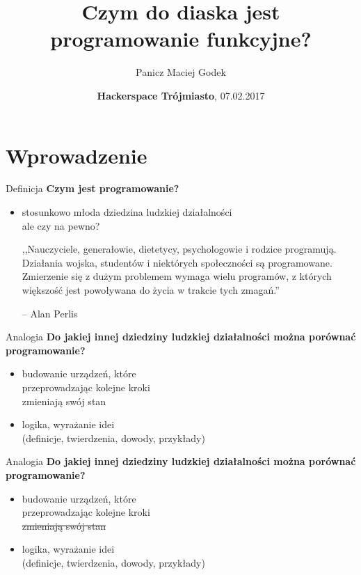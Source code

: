 \documentclass{beamer}
\title{\textbf{Czym do diaska jest programowanie funkcyjne?}}
\author{Panicz Maciej Godek}
\institute{
  \tiny{\href{mailto:godek.maciek@gmail.com}{\textbf{godek.maciek@gmail.com}}}
}
\date{\textbf{Hackerspace Trójmiasto}, 07.02.2017}
\begin{document}
\begin{frame}
  \titlepage
\end{frame}

\section{Wprowadzenie}

\begin{frame}{Definicja}
  \textbf{Czym jest programowanie?}
  \pause
  \begin{itemize}
  \item stosunkowo młoda dziedzina ludzkiej działalności
    \pause
    \\ ale czy na pewno?
    \pause
    \begin{displayquote}
      ,,Nauczyciele, generałowie, dietetycy, psychologowie i rodzice programują.
      Działania wojska, studentów i niektórych społeczności są programowane.
      Zmierzenie się z dużym problemem wymaga wielu programów, z których
      większość jest powoływana do życia w trakcie tych zmagań.''
    \end{displayquote}
    -- Alan Perlis
    
  \end{itemize}

\end{frame}

\begin{frame}{Analogia}
  \textbf{Do jakiej innej dziedziny ludzkiej działalności
    można porównać programowanie?}
  \pause
  \begin{itemize}
  \item budowanie urządzeń\pause, które \\
    przeprowadzając kolejne kroki \\
    \pause zmieniają swój stan
    \pause
  \item logika, wyrażanie idei \\
    \pause (definicje, twierdzenia, dowody, przykłady)
  \end{itemize}
\end{frame}


\begin{frame}{Analogia}
  \textbf{Do jakiej innej dziedziny ludzkiej działalności
    można porównać programowanie?}
  \begin{itemize}
  \item budowanie urządzeń, które \\
    przeprowadzając kolejne kroki \\
    \sout{zmieniają swój stan}
  \item logika, wyrażanie idei \\
    (definicje, twierdzenia, dowody, przykłady)
  \end{itemize}
\end{frame}
\end{document}
